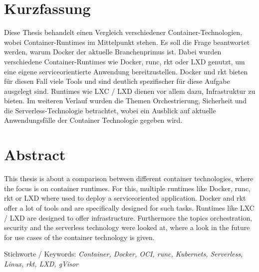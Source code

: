 
\chapter{Kurzfassung}
\label{chap:kurzfassung}

Diese Thesis behandelt einen Vergleich verschiedener Container-Technologien, wobei Container-Runtimes im Mittelpunkt stehen. Es soll die Frage beantwortet werden, warum Docker der aktuelle Branchenprimus ist. Dabei wurden verschiedene Container-Runtimes wie Docker, runc, rkt oder LXD genutzt, um eine eigene serviceorientierte Anwendung bereitzustellen. Docker und rkt bieten für diesen Fall viele Tools und sind deutlich spezifischer für diese Aufgabe ausgelegt sind. Runtimes wie LXC / LXD dienen vor allem dazu, Infrastruktur zu bieten. Im weiteren Verlauf wurden die Themen Orchestrierung, Sicherheit und die Serverless-Technologie betrachtet, wobei ein Ausblick auf aktuelle Anwendungsfälle der Container Technologie gegeben wird.

\begingroup
\let\cleardoublepage\relax
\chapter{Abstract}
\label{chap:Abstract}

This thesis is about a comparison between different container technologies, where the focus is on container runtimes. For this, multiple runtimes like Docker, runc, rkt or LXD where used to deploy a serviceoriented application. Docker and rkt offer a lot of tools and are specifically designed for such tasks. Runtimes like LXC / LXD are designed to offer infrastructure. Furthermore the topics orchestration, security and the serverless technology were looked at, where a look in the future for  use cases of the container technology is given.


Stichworte / Keywords: \textit{Container, Docker, OCI, runc, Kubernets, Serverless, Linux, rkt, LXD, gVisor}
\endgroup